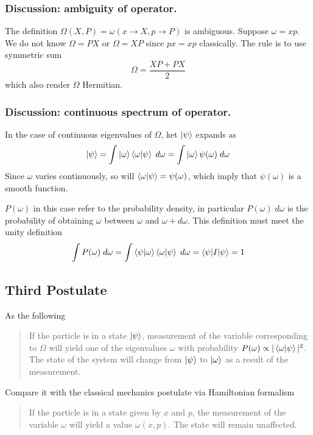 \documentclass[../../../main.tex]{subfiles}
\begin{document}
\subsubsection{Discussion: ambiguity of operator.}
The definition $        \Omega(X,P)=\omega \left( x\rightarrow X, p\rightarrow P \right) $ is ambiguous.
Suppose $\omega=xp$.
We do not know $\Omega=PX$ or $\Omega=XP$ since $px=xp$ classically.
The rule is to use symmetric sum
\begin{equation*}
    \Omega=\frac{XP+PX }{2}
\end{equation*}
which also render $\Omega$ Hermitian.

\subsubsection{Discussion: continuous spectrum of operator.}
In the case of continuous eigenvalues of $\Omega$, ket $\ket{\psi}$ expands as
\begin{equation*}
    \ket{\psi}=\int \ket{\omega}\braket{\omega|\psi}\;d\omega=\int \ket{\omega}\psi(\omega)\;d\omega
\end{equation*}
Since $\omega$ varies continuously, so will $\braket{\omega|\psi}=\psi(\omega)$, which imply that $\psi(\omega)$ is a smooth function.

$P(\omega)$ in this case refer to the probability density, in particular $P(\omega)\;d\omega$ is the probability of obtaining $\omega$ between $\omega$ and $\omega+d\omega$.
This definition must meet the unity definition
\begin{equation*}
    \int P(\omega)\;d\omega=\int \braket{\psi|\omega}\braket{\omega|\psi}\;d\omega=\braket{\psi|I|\psi}=1
\end{equation*}

\subsection{Third Postulate}
As the following
\begin{quotation}
    If the particle is in a state $\ket{\psi}$, measurement of the variable corresponding to $\Omega$ will yield one of the eigenvalues $\omega$ with probability $P(\omega)\propto |\braket{\omega|\psi}|^2$. The state of the system will change from $\ket{\psi}$ to $\ket{\omega}$ as a result of the measurement.
\end{quotation}
Compare it with the classical mechanics postulate via Hamiltonian formalism
\begin{quotation}
    If the particle is in a state given by $x$ and $p$, the measurement of the variable $\omega$ will yield a value $\omega(x,p)$. The state will remain unaffected.
\end{quotation}
\end{document}
